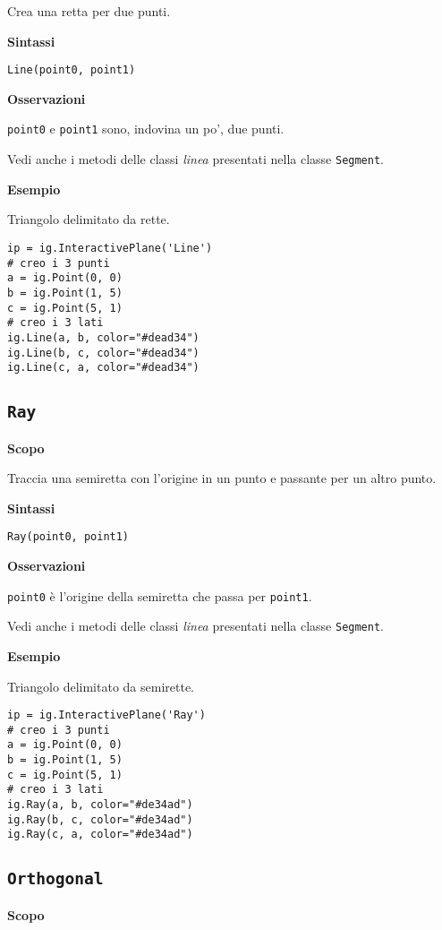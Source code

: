Crea una retta per due punti.

\textbf{Sintassi}

\begin{lstlisting}
Line(point0, point1)
\end{lstlisting}

\textbf{Osservazioni}

\texttt{point0} e \texttt{point1} sono, indovina un po', due punti.

Vedi anche i metodi delle classi \emph{linea} presentati nella classe 
\texttt{Segment}.

\textbf{Esempio}

Triangolo delimitato da rette.

\begin{lstlisting}
ip = ig.InteractivePlane('Line')
# creo i 3 punti
a = ig.Point(0, 0)
b = ig.Point(1, 5)
c = ig.Point(5, 1)
# creo i 3 lati
ig.Line(a, b, color="#dead34")
ig.Line(b, c, color="#dead34")
ig.Line(c, a, color="#dead34")
\end{lstlisting}


\subsection{\texttt{Ray}}
\label{sub:geoint_ray}
\textbf{Scopo}

Traccia una semiretta con l'origine in un punto e passante per un altro
punto.

\textbf{Sintassi}

\begin{lstlisting}
Ray(point0, point1)
\end{lstlisting}

\textbf{Osservazioni}

\texttt{point0} è l'origine della semiretta che passa per \texttt{point1}.

Vedi anche i metodi delle classi \emph{linea} presentati nella classe 
\texttt{Segment}.

\textbf{Esempio}

Triangolo delimitato da semirette.

\begin{lstlisting}
ip = ig.InteractivePlane('Ray')
# creo i 3 punti
a = ig.Point(0, 0)
b = ig.Point(1, 5)
c = ig.Point(5, 1)
# creo i 3 lati
ig.Ray(a, b, color="#de34ad")
ig.Ray(b, c, color="#de34ad")
ig.Ray(c, a, color="#de34ad")
\end{lstlisting}


\subsection{\texttt{Orthogonal}}
\label{sub:geoint_orthogonal}
\textbf{Scopo}

